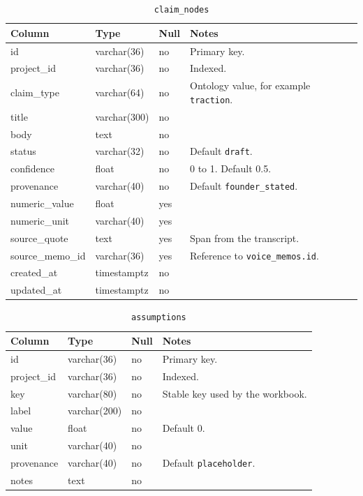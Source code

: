 \documentclass[11pt,a4paper]{article}
\begin{document}
\begin{table}[ht]
\centering
\caption{\texttt{claim\_nodes}}
\small
\begin{tabular}{@{}llll@{}}
\toprule
\textbf{Column} & \textbf{Type} & \textbf{Null} & \textbf{Notes} \\
\midrule
id & varchar(36) & no & Primary key. \\
project\_id & varchar(36) & no & Indexed. \\
claim\_type & varchar(64) & no & Ontology value, for example \texttt{traction}. \\
title & varchar(300) & no & \\
body & text & no & \\
status & varchar(32) & no & Default \texttt{draft}. \\
confidence & float & no & 0 to 1. Default 0.5. \\
provenance & varchar(40) & no & Default \texttt{founder\_stated}. \\
numeric\_value & float & yes & \\
numeric\_unit & varchar(40) & yes & \\
source\_quote & text & yes & Span from the transcript. \\
source\_memo\_id & varchar(36) & yes & Reference to \texttt{voice\_memos.id}. \\
created\_at & timestamptz & no & \\
updated\_at & timestamptz & no & \\
\bottomrule
\end{tabular}
\end{table}

\begin{table}[ht]
\centering
\caption{\texttt{assumptions}}
\small
\begin{tabular}{@{}llll@{}}
\toprule
\textbf{Column} & \textbf{Type} & \textbf{Null} & \textbf{Notes} \\
\midrule
id & varchar(36) & no & Primary key. \\
project\_id & varchar(36) & no & Indexed. \\
key & varchar(80) & no & Stable key used by the workbook. \\
label & varchar(200) & no & \\
value & float & no & Default 0. \\
unit & varchar(40) & no & \\
provenance & varchar(40) & no & Default \texttt{placeholder}. \\
notes & text & no & \\
\bottomrule
\end{tabular}
\end{table}
\end{document}
